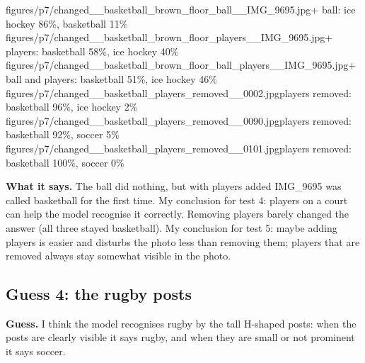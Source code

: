 \documentclass[11pt]{article}
\begin{document}
           {figures/p7/changed__basketball_brown_floor_ball__IMG_9695.jpg}{+ ball: ice hockey 86\%, basketball 11\%}
           {figures/p7/changed__basketball_brown_floor_players__IMG_9695.jpg}{+ players: basketball 58\%, ice hockey 40\%}
           {figures/p7/changed__basketball_brown_floor_ball_players__IMG_9695.jpg}{+ ball and players: basketball 51\%, ice hockey 46\%}
           {figures/p7/changed__basketball_players_removed__0002.jpg}{players removed: basketball 96\%, ice hockey 2\%}
           {figures/p7/changed__basketball_players_removed__0090.jpg}{players removed: basketball 92\%, soccer 5\%}
           {figures/p7/changed__basketball_players_removed__0101.jpg}{players removed: basketball 100\%, soccer 0\%}

\textbf{What it says.} The ball did nothing, but with players added IMG\_9695 was
called basketball for the first time. My conclusion for test 4: players on a court
can help the model recognise it correctly. Removing players barely changed the
answer (all three stayed basketball). My conclusion for test 5: maybe adding
players is easier and disturbs the photo less than removing them; players that are
removed always stay somewhat visible in the photo.

\subsection*{Guess 4: the rugby posts}

\textbf{Guess.} I think the model recognises rugby by the tall H-shaped posts:
when the posts are clearly visible it says rugby, and when they are small or not
prominent it says soccer.
\end{document}

